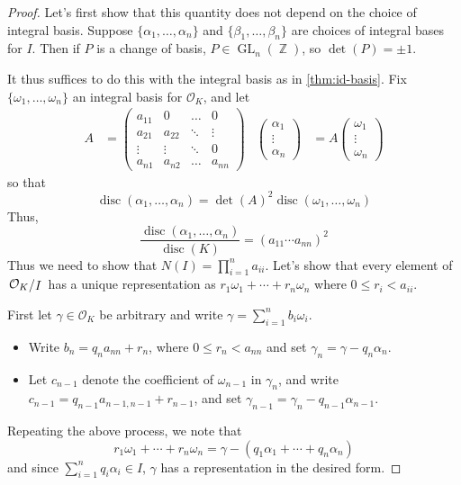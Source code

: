 \documentclass[11pt, a4paper]{memoir}
\DeclareMathOperator{\Z}{{\mathbb{Z}}}
\theoremstyle{change}
\theoremstyle{plain}
\theoremstyle{nonumberplain}
\newtheorem{proof}{Proof}
\DeclareMathOperator{\disc}{disc}
\DeclareMathOperator{\GL}{GL}
\newcommand{\quot}[2]{\mathchoice{\left.\raisebox{0.13em}{$#1$}\middle/\raisebox{-0.13em}{$#2$}\right.}
                                 {\left.\raisebox{0.07em}{$#1$}\middle/\raisebox{-0.07em}{$#2$}\right.}
                                 {\left.\raisebox{0.03em}{$#1$}\middle/\raisebox{-0.03em}{$#2$}\right.}
                                 {\left.\raisebox{0em}{$#1$}\middle/\raisebox{0em}{$#2$}\right.}}
\numberwithin{equation}{section}
\begin{document}
\begin{proof}
    Let's first show that this quantity does not depend on the choice of integral basis.
    Suppose $\{\alpha_1,\ldots,\alpha_n\}$ and $\{\beta_1,\ldots,\beta_n\}$ are choices of integral bases for $I$.
    Then if $P$ is a change of basis, $P\in\GL_n(\Z)$, so $\det(P)=\pm 1$.

    It thus suffices to do this with the integral basis as in \cref{thm:id-basis}.
    Fix $\{\omega_1,\ldots,\omega_n\}$ an integral basis for $\mathcal{O}_K$, and let
    \begin{align*}
        A&=
        \begin{pmatrix}
            a_{11}&0&\hdots&0\\
            a_{21}&a_{22}&\ddots&\vdots\\
            \vdots&\vdots&\ddots&0\\
            a_{n1}&a_{n2}&\hdots&a_{nn}
        \end{pmatrix}
        &
        \begin{pmatrix}\alpha_1\\\vdots\\\alpha_n\end{pmatrix}&=A\begin{pmatrix}\omega_1\\\vdots\\\omega_n\end{pmatrix}
    \end{align*}
    so that
    \begin{equation*}
        \disc(\alpha_1,\ldots,\alpha_n) = \det(A)^2\disc(\omega_1,\ldots,\omega_n)
    \end{equation*}
    Thus,
    \begin{equation*}
        \frac{\disc(\alpha_1,\ldots,\alpha_n)}{\disc(K)}=(a_{11}\cdots a_{nn})^2
    \end{equation*}
    Thus we need to show that $N(I)=\prod_{i=1}^n a_{ii}$.
    Let's show that every element of $\quot{\mathcal{O}_K}{I}$ has a unique representation as $r_1\omega_1+\cdots+r_n\omega_n$ where $0\leq r_i<a_{ii}$.

    First let $\gamma\in\mathcal{O}_K$ be arbitrary and write $\gamma=\sum_{i=1}^n b_i\omega_i$.
    \begin{itemize}[nl]
        \item Write $b_n=q_na_{nn}+r_n$, where $0\leq r_n<a_{nn}$ and set $\gamma_n=\gamma-q_n\alpha_n$.
        \item Let $c_{n-1}$ denote the coefficient of $\omega_{n-1}$ in $\gamma_n$, and write $c_{n-1}=q_{n-1}a_{n-1,n-1}+r_{n-1}$, and set $\gamma_{n-1}=\gamma_n-q_{n-1}\alpha_{n-1}$.
    \end{itemize}
    Repeating the above process, we note that
    \begin{equation*}
        r_1\omega_1+\cdots+r_n\omega_n = \gamma-\left(q_1\alpha_1+\cdots+q_n\alpha_n\right)
    \end{equation*}
    and since $\sum_{i=1}^n q_i\alpha_i\in I$, $\gamma$ has a representation in the desired form.


\end{proof}
\end{document}
